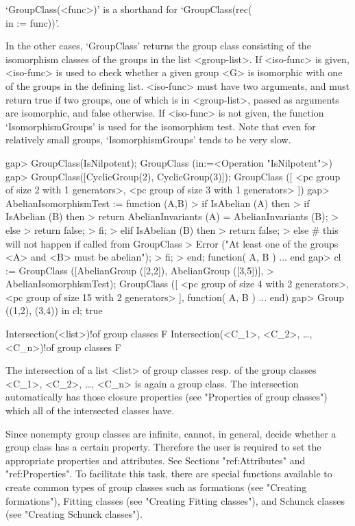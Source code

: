 `GroupClass(<func>)' is a shorthand for `GroupClass(rec(\\in := func))'.

In the other cases, `GroupClass' returns the group
class consisting of the isomorphism classes of the groups in the list
<group-list>. If <iso-func> is
given, <iso-func> is used to check whether a given group <G> is isomorphic
with one of the groups in the defining list. <iso-func> must have two
arguments, and must return true if two groups, one of which is in
<group-list>, passed as arguments are isomorphic, and false otherwise. If
<iso-func> is not given, the {\GAP} function `IsomorphismGroups' is used for
the isomorphism test. Note that even for relatively small groups,
`IsomorphismGroups' tends to be very slow. 


\beginexample
gap> GroupClass(IsNilpotent);
GroupClass (in:=<Operation "IsNilpotent">)
gap> GroupClass([CyclicGroup(2), CyclicGroup(3)]);
GroupClass ([ <pc group of size 2 with 1 generators>, 
  <pc group of size 3 with 1 generators> ])
gap> AbelianIsomorphismTest := function (A,B)
>     if IsAbelian (A) then
>         if IsAbelian (B) then
>             return AbelianInvariants (A) = AbelianInvariants (B);
>         else
>             return false;
>         fi;
>     elif IsAbelian (B) then
>         return false;
>     else # this will not happen if called from GroupClass
>         Error ("At least one of the groups <A> and <B> must be abelian");
>     fi;
> end;
function( A, B ) ... end
gap> cl := GroupClass ([AbelianGroup ([2,2]), AbelianGroup ([3,5])],
> AbelianIsomorphismTest);
GroupClass ([ <pc group of size 4 with 2 generators>, 
  <pc group of size 15 with 2 generators> ], function( A, B ) ... end)
gap> Group ((1,2), (3,4)) in cl;
true
\endexample


\>Intersection(<list>)!{of group classes} F
\>Intersection(<C_1>, <C_2>, \dots, <C_n>)!{of group classes} F

The intersection of a list <list> of group classes resp. of the group
classes <C_1>, <C_2>, \dots, <C_n> is again
a group class. The intersection automatically has those closure properties
(see "Properties of group classes") which all of the intersected classes
have. 


\null

%
%

Since nonempty group classes are infinite, {\CRISP} cannot, in
general, decide whether a group class has a certain property. Therefore the
user is required to set the appropriate properties and attributes. 
See Sections "ref:Attributes" and "ref:Properties". To facilitate this task, 
there are special functions available to
create common types of group classes such as formations (see "Creating
formations"), Fitting classes (see "Creating Fitting classes"), and Schunck
classes (see "Creating Schunck classes").

